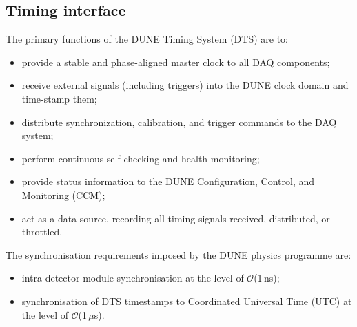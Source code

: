 \subsection{Timing interface}

\label{sec:systems-timing}

The primary functions of the DUNE Timing System (DTS) are to:
\begin{itemize}[nosep]
  \item provide a stable and phase-aligned master clock to all DAQ components;
  \item receive external signals (including triggers) into the DUNE clock domain and time-stamp them;
  \item distribute synchronization, calibration, and trigger commands to the DAQ system;
  \item perform continuous self-checking and health monitoring;
  \item provide status information to the DUNE Configuration, Control, and Monitoring (CCM);
  \item act as a data source, recording all timing signals received, distributed, or throttled.
\end{itemize}

The synchronisation requirements imposed by the DUNE physics programme are:
\begin{itemize}[nosep]
  \item intra-detector module synchronisation at the level of $\mathcal{O}$(1\,ns);
  \item synchronisation of DTS timestamps to Coordinated Universal Time (UTC) at the level of $\mathcal{O}$(1\,$\mu$s).
\end{itemize}
